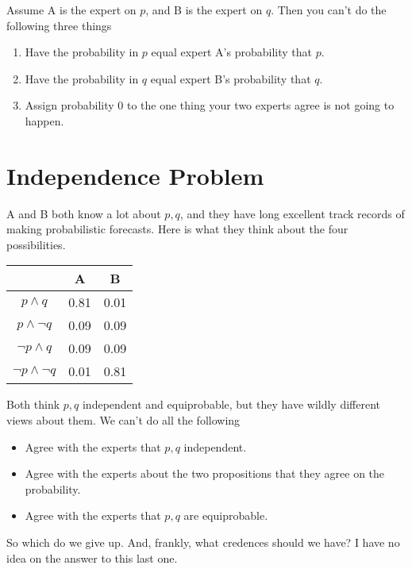 \documentclass[11pt,]{article}
\providecommand{\tightlist}{%
  \setlength{\itemsep}{0pt}\setlength{\parskip}{0pt}}
\begin{document}
Assume A is the expert on \(p\), and B is the expert on \(q\). Then you
can't do the following three things

\begin{enumerate}
\def\labelenumi{\arabic{enumi}.}
\tightlist
\item
  Have the probability in \(p\) equal expert A's probability that \(p\).
\item
  Have the probability in \(q\) equal expert B's probability that \(q\).
\item
  Assign probability 0 to the one thing your two experts agree is not
  going to happen.
\end{enumerate}

\hypertarget{independence-problem}{%
\section{Independence Problem}\label{independence-problem}}

A and B both know a lot about \(p, q\), and they have long excellent
track records of making probabilistic forecasts. Here is what they think
about the four possibilities.

\begin{longtable}[]{@{}ccc@{}}
\toprule
& A & B\tabularnewline
\midrule
\endhead
\(p \wedge q\) & 0.81 & 0.01\tabularnewline
\(p \wedge \neg q\) & 0.09 & 0.09\tabularnewline
\(\neg p \wedge q\) & 0.09 & 0.09\tabularnewline
\(\neg p \wedge \neg q\) & 0.01 & 0.81\tabularnewline
\bottomrule
\end{longtable}

Both think \(p, q\) independent and equiprobable, but they have wildly
different views about them. We can't do all the following

\begin{itemize}
\tightlist
\item
  Agree with the experts that \(p, q\) independent.
\item
  Agree with the experts about the two propositions that they agree on
  the probability.
\item
  Agree with the experts that \(p, q\) are equiprobable.
\end{itemize}

So which do we give up. And, frankly, what credences should we have? I
have no idea on the answer to this last one.
\end{document}
